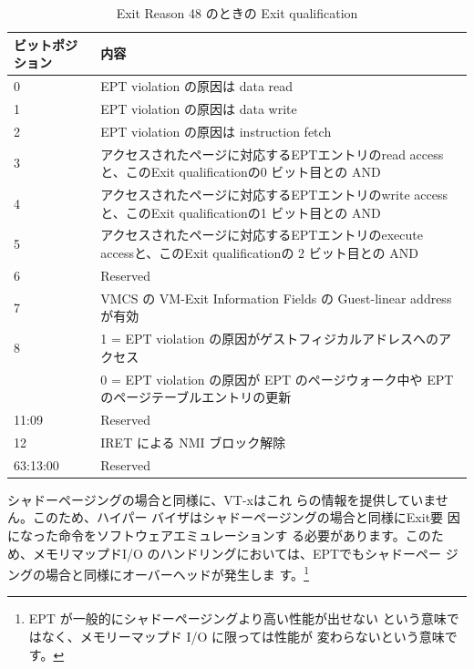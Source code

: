 \begin{table}
\begin{tabular}{|l|l|} \hline

ビットポジション & 内容 \\
\hline
0	& EPT violation の原因は data read \\
\hline

1	& EPT violation の原因は data write \\
\hline

2	& EPT violation の原因は instruction fetch \\
\hline

3 & アクセスされたページに対応するEPTエントリのread accessと、このExit qualificationの0 ビット目との AND \\
\hline

4 & アクセスされたページに対応するEPTエントリのwrite accessと、このExit qualificationの1 ビット目との AND \\
\hline

5 & アクセスされたページに対応するEPTエントリのexecute accessと、このExit qualificationの 2 ビット目との AND \\
\hline

6 & Reserved \\
\hline

7 & VMCS の VM-Exit Information Fields の Guest-linear address が有効 \\
\hline

8 & 1 = EPT violation の原因がゲストフィジカルアドレスへのアクセス \\
	& 0 = EPT violation の原因が EPT のページウォーク中や EPT のページテーブルエントリの更新  \\
\hline


11:09 & Reserved \\
\hline

12 & IRET による NMI ブロック解除 \\
\hline

63:13:00 & Reserved \\
\hline



\end{tabular}
\caption{Exit Reason 48 のときの Exit qualification}
\label{tab3}

\end{table}

 シャドーページングの場合と同様に、VT-xはこれ
らの情報を提供していません。このため、ハイパー
バイザはシャドーページングの場合と同様にExit要
因になった命令をソフトウェアエミュレーションす
る必要があります。このため、メモリマップドI/O
のハンドリングにおいては、EPTでもシャドーペー
ジングの場合と同様にオーバーヘッドが発生しま
す。\footnote[3]{
EPT が一般的にシャドーページングより高い性能が出せない
という意味ではなく、メモリーマップド I/O に限っては性能が
変わらないという意味です。
}

